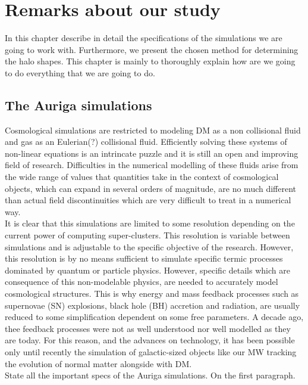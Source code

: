 \chapter{Remarks about our study}
In this chapter describe in detail the specifications of the simulations we are going to work with. Furthermore, we present the chosen method for determining the halo shapes. This chapter is mainly to thoroughly explain how are we going to do everything that we are going to do.\\

\section{The Auriga simulations}
Cosmological simulations are restricted to modeling DM as a non collisional fluid and gas as an Eulerian(?) collisional fluid. Efficiently solving these systems of non-linear equations is an intrincate puzzle and it is still an open and improving field of research. 
Difficulties in the numerical modelling of these fluids arise from the wide range of values that quantities take in the context of cosmological objects, which can expand in several orders of magnitude, are no much different than actual field discontinuities which are very difficult to treat in a numerical way.\\

It is clear that this simulations are limited to some resolution depending on the current power of computing super-clusters. This resolution is variable between simulations and is adjustable to the specific objective of the research. However, this resolution is by no means sufficient to simulate specific termic processes dominated by quantum or particle physics. However, specific details which are consequence of this non-modelable physics, are needed to accurately model cosmological structures. This is why energy and mass feedback processes such as supernovae (SN) explosions, black hole (BH) accretion and radiation, are usually reduced to some simplification dependent on some free parameters. A decade ago, thee feedback processes were not as well understood nor well modelled as they are today. For this reason, and the advances on technology, it has been possible only until recently the simulation of galactic-sized objects like our MW tracking the evolution of normal matter alongside with DM.\\


State all the important specs of the Auriga simulations. On the first paragraph.\\

